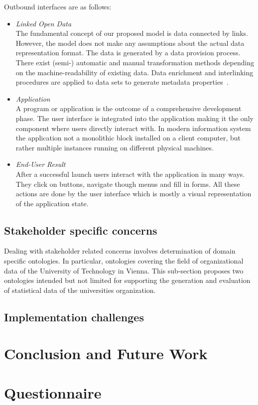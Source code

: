 \documentclass{article}
\begin{document}
Outbound interfaces are as follows:
\begin{itemize}
	\item \textit{Linked Open Data}~\\
	The fundamental concept of our proposed model is data connected by links. However, the model does not make any assumptions about the actual data representation format. The data is generated by a data provision process. There exist (semi-) automatic and manual transformation methods depending on the machine-readability of existing data. Data enrichment and interlinking procedures are applied to data sets to generate metadata properties~\cite{inproceedings:soa-architecture}. 
	\item \textit{Application}~\\
	A program or application is the outcome of a comprehensive development phase. The user interface is integrated into the application making it the only component where users directly interact with. In modern information system the application not a monolithic block installed on a client computer, but rather multiple instances running on different physical machines. 
	\item \textit{End-User Result}~\\
	After a successful launch users interact with the application in many ways. They click on buttons, navigate though menus and fill in forms. All these actions are done by the user interface which is mostly a visual representation of the application state. 
\end{itemize}

\subsection{Stakeholder specific concerns}
Dealing with stakeholder related concerns involves determination of domain specific ontologies. In particular, ontologies covering the field of organizational data of the University of Technology in Vienna. This sub-section proposes two ontologies intended but not limited for supporting the generation and evaluation of statistical data of the universities organization. 


\subsection{Implementation challenges}

\section{Conclusion and Future Work}

\newpage



\newpage
\appendix
\section{Questionnaire}

\end{document}
